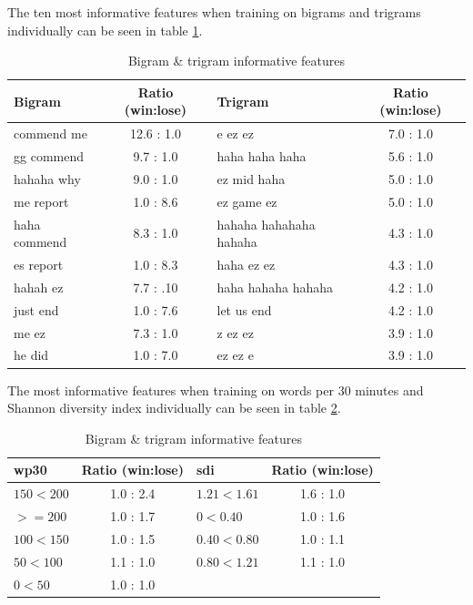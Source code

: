 \documentclass[12pt,a4paper]{article}
\begin{document}
The ten most informative features when training on bigrams and trigrams individually can be
seen in table \ref{tab:ngrams}.
\begin{table}[h]
    \begin{center}
        \begin{tabular}{l | c | l | c}
            Bigram     & Ratio (win:lose) & Trigram & Ratio (win:lose) \\\hline
            commend me & 12.6 : 1.0 & e ez ez        & 7.0 : 1.0 \\
            gg commend & 9.7 : 1.0  & haha haha haha & 5.6 : 1.0 \\
            hahaha why & 9.0 : 1.0  & ez mid haha    & 5.0 : 1.0 \\
            me report  & 1.0 : 8.6  & ez game ez     & 5.0 : 1.0 \\
            haha commend  & 8.3 : 1.0  & hahaha hahahaha hahaha     & 4.3 : 1.0 \\
            es report  & 1.0 : 8.3  & haha ez ez     & 4.3 : 1.0 \\
            hahah ez  & 7.7 : .10  & haha hahaha hahaha     & 4.2 : 1.0 \\
            just end  & 1.0 : 7.6  & let us end     & 4.2 : 1.0 \\
            me ez  & 7.3 : 1.0  & z ez ez     & 3.9 : 1.0 \\
            he did  & 1.0 : 7.0  & ez ez e     & 3.9 : 1.0 \\

        \end{tabular}
        \caption{Bigram \& trigram informative features}
        \label{tab:ngrams}
    \end{center}
\end{table}

The most informative features when training on words per 30 minutes and Shannon diversity index
individually can be seen in table \ref{tab:sdi}.

\begin{table}[h]
    \begin{center}
        \begin{tabular}{l | c | l | c}
            wp30     & Ratio (win:lose) & sdi & Ratio (win:lose) \\\hline
            $150<200$  & 1.0 : 2.4  & $1.21<1.61$    & 1.6 : 1.0 \\
            $>=200$  & 1.0 : 1.7  & $0<0.40$   & 1.0 : 1.6 \\
            $100<150$ & 1.0 : 1.5  & $0.40<0.80$  & 1.0 : 1.1 \\
            $50<100$ & 1.1 : 1.0  &  $0.80<1.21$  & 1.1 : 1.0 \\
            $0<50$ & 1.0 : 1.0 & &  \\

        \end{tabular}
        \caption{Bigram \& trigram informative features}
        \label{tab:sdi}
    \end{center}
\end{table}
\end{document}
